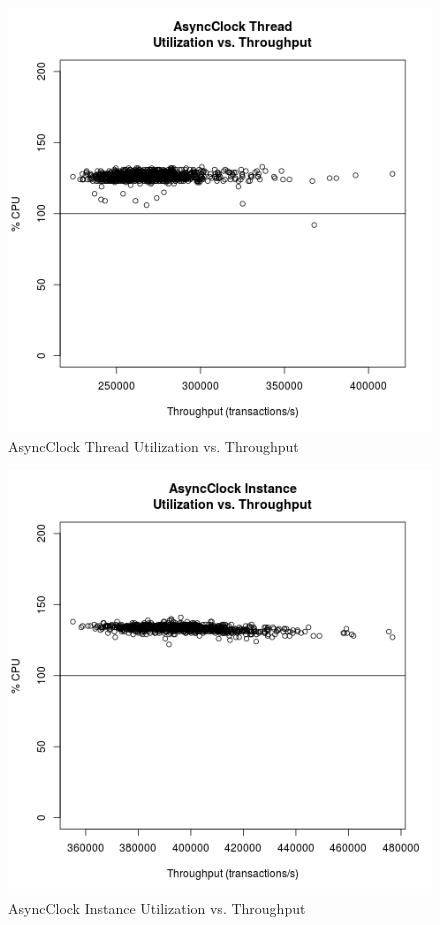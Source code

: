 \begin{figure}[H]
\center
\includegraphics[height=.4\textheight]{async_thread_throughput_utilization.png}
\caption{AsyncClock Thread Utilization vs. Throughput}
\label{async_thread_throughput_utilization}
\end{figure}

\begin{figure}[H]
\center
\includegraphics[height=.4\textheight]{async_instance_throughput_utilization.png}
\caption{AsyncClock Instance Utilization vs. Throughput}
\label{async_instance_throughput_utilization}
\end{figure}

